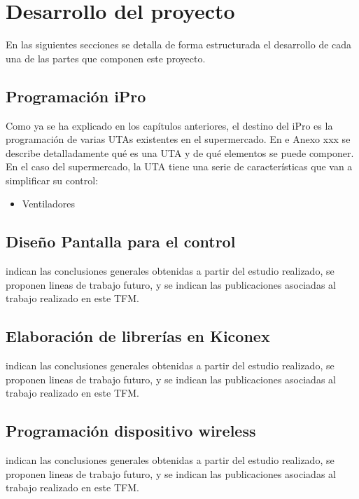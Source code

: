 
\cleardoublepage
\chapter{Desarrollo del proyecto}

\label{chap:desarrolloProyecto} %

En las siguientes secciones se detalla de forma estructurada el desarrollo de cada una de las partes que componen este proyecto.


\section{Programación iPro}
\label{sec:programacionipro}
Como ya se ha explicado en los capítulos anteriores, el destino del iPro es la programación de varias UTAs existentes en el supermercado. En e Anexo xxx se describe detalladamente qué es una UTA y de qué elementos se puede componer. En el caso del supermercado, la UTA tiene una serie de características que van a simplificar su control:

\begin{itemize}
    \item Ventiladores
\end{itemize}



\section{Diseño Pantalla para el control}
\label{sec:programacionpantalla}
indican las conclusiones generales obtenidas a partir del estudio realizado, se proponen lineas de trabajo futuro, y se indican las publicaciones asociadas al trabajo realizado en este TFM.
\section{Elaboración de librerías en Kiconex}
\label{sec:librerias}
indican las conclusiones generales obtenidas a partir del estudio realizado, se proponen lineas de trabajo futuro, y se indican las publicaciones asociadas al trabajo realizado en este TFM.
\section{Programación dispositivo wireless}
\label{sec:programacionesp32}
indican las conclusiones generales obtenidas a partir del estudio realizado, se proponen lineas de trabajo futuro, y se indican las publicaciones asociadas al trabajo realizado en este TFM.
